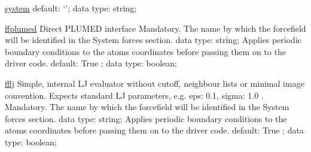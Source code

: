 \begin{ipifield}{}
\begin{ipifield}{\hyperref[SYSTEM]{system}}
{{default: `'; data type: string; }%
}
\end{ipifield}
\begin{ipifield}{\hyperref[FFPLUMED]{ffplumed}}%
{ Direct PLUMED interface }%
{}%
{%
{Mandatory. The name by which the forcefield will be identified in the System forces section.}%
{data type: string; }%
%
{Applies periodic boundary conditions to the atoms coordinates before passing them on to the driver code.}%
{default:  True ; data type: boolean; }%
}
\end{ipifield}
\begin{ipifield}{\hyperref[FFLJ]{fflj}}%
{Simple, internal LJ evaluator without cutoff, neighbour lists or minimal image convention.
                   Expects standard LJ parameters, e.g. { eps: 0.1, sigma: 1.0 }. }%
{}%
{%
{Mandatory. The name by which the forcefield will be identified in the System forces section.}%
{data type: string; }%
%
{Applies periodic boundary conditions to the atoms coordinates before passing them on to the driver code.}%
{default:  True ; data type: boolean; }%
}
\end{ipifield}
\end{ipifield}
